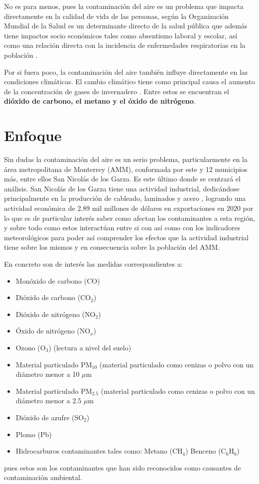 \documentclass[journal, 10pt]{IEEEtran}                                                          %
\begin{document}
No es para menos, pues la contaminación del aire es un problema que impacta directamente en la calidad de vida de las personas, según la Organización Mundial de la Salud es un determinante directo de la salud pública que además tiene impactos socio económicos tales como absentismo laboral y escolar, así como una relación directa con la incidencia de enfermedades respiratorias en la población \cite{efectosSalud}. 

Por si fuera poco, la contaminación del aire también influye directamente en las condiciones climáticas. El cambio climático tiene como principal causa el aumento de la concentración de gases de invernadero \cite{climateChange}. Entre estos se encuentran el \textbf{dióxido de carbono, el metano y el óxido de nitrógeno}. 


\section{Enfoque} \label{enfoque}

Sin dudas la contaminación del aire es un serio problema, particularmente en la área metropolitana de Monterrey (AMM), conformada por este y 12 municipios más, entre ellos San Nicolás de los Garza. Es este último donde se centrará el análisis. San Nicolás de los Garza tiene una actividad industrial, dedicándose principalmente en la producción de cableado, laminados y acero , logrando una actividad económica de 2.89 mil millones de dólares en exportaciones en 2020\cite{dataméxico} por lo que es de particular interés saber como afectan los contaminantes a esta región, y sobre todo como estos interactúan entre si con así como con los indicadores meteorológicos para poder así comprender los efectos que la actividad industrial tiene sobre los mismos y en consecuencia sobre la población del AMM.  

En concreto son de interés las medidas correspondientes a:
\begin{itemize}
    \item Monóxido de carbono (CO)
    \item Dióxido de carbono (CO$_2$)
    \item Dióxido de nitrógeno (NO$_2$)
    \item Óxido de nitrógeno (NO$_x$)
    \item Ozono (O$_3$) (lectura a nivel del suelo)
    \item Material particulado PM$_{10}$ (material particulado como cenizas o polvo con un diámetro menor a 10 $\mu$m
    \item Material particulado PM$_{2.5}$ (material particulado como cenizas o polvo con un diámetro menor a 2.5 $\mu$m
    \item Dióxido de azufre (SO$_2$)
    \item Plomo (Pb)
    \item Hidrocarburos contaminantes tales como:
    \subitem Metano (CH$_4$)
    \subitem Benceno (C$_6$H$_6$)
\end{itemize}
pues estos son los contaminantes que han sido reconocidos como causantes de contaminación ambiental. 
\end{document}
